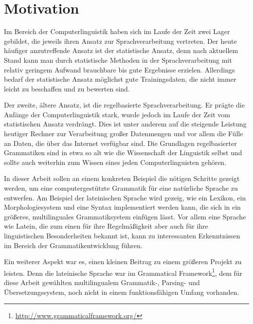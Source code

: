 \documentclass[12pt,abstract=on,titlepage,bibliography=totoc,ngerman,listof=totoc]{scrreprt}
\begin{document}
\section{Motivation}
\label{sec:motivation}
Im Bereich der Computerlinguistik haben sich im Laufe der Zeit zwei Lager gebildet, die jeweils ihren Ansatz zur Sprachverarbeitung vertreten. Der heute häufiger anzutreffende Ansatz ist der statistische Ansatz, denn nach aktuellem Stand kann man durch statistische Methoden in der Sprachverarbeitung mit relativ geringem Aufwand brauchbare bis gute Ergebnisse erzielen. Allerdings bedarf der statistische Ansatz möglichst gute Trainingsdaten, die nicht immer leicht zu beschaffen und zu bewerten sind. \par
Der zweite, ältere Ansatz, ist die regelbasierte Sprachverarbeitung. Er prägte die Anfänge der Computerlinguistik stark, wurde jedoch im Laufe der Zeit vom statistischen Ansatz verdrängt. Dies ist unter anderem auf die steigende Leistung heutiger Rechner zur Verarbeitung großer Datenmengen und vor allem die Fülle an Daten, die über das Internet verfügbar sind. Die Grundlagen regelbasierter Grammatiken sind in etwa so alt wie die Wissenschaft der Linguistik selbst und sollte auch weiterhin zum Wissen eines jeden Computerlinguisten gehören. \par
In dieser Arbeit sollen an einem konkreten Beispiel die nötigen Schritte gezeigt werden, um eine computergestützte Grammatik für eine natürliche Sprache zu entwerfen. Am Beispiel der lateinischen Sprache wird gezeig, wie ein Lexikon, ein Morphologiesystem und eine Syntax implementiert werden kann, die sich in ein größeres, multilinguales Grammatiksystem einfügen lässt. Vor allem eine Sprache wie Latein, die zum einen für ihre Regelmäßigkeit aber auch für ihre linguistischen Besonderheiten bekannt ist, kann zu interessanten Erkenntnissen im Bereich der Grammatikentwicklung führen. \par
Ein weiterer Aspekt war es, einen kleinen Beitrag zu einem größeren Projekt zu leisten. Denn die lateinische Sprache war im Grammatical Framework\footnote{\url{http://www.grammaticalframework.org/}}, dem für diese Arbeit gewählten multilingualem Grammatik-, Parsing- und Übersetzungssystem, noch nicht in einem funktionsfähigen Umfang vorhanden.
\pagebreak
\end{document}
